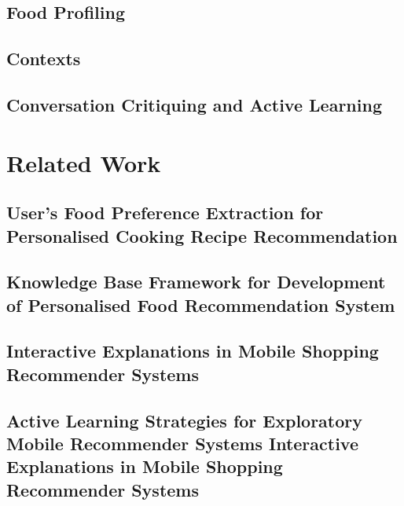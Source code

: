 \subsection{Food Profiling}

\subsection{Contexts}

\subsection{Conversation Critiquing and Active Learning}



\section{Related Work}

\subsection{User's Food Preference Extraction for Personalised Cooking Recipe Recommendation}

\subsection{Knowledge Base Framework for Development of Personalised Food Recommendation System}

\subsection{Interactive Explanations in Mobile Shopping Recommender Systems}

\subsection{Active Learning Strategies for Exploratory Mobile Recommender Systems Interactive Explanations in Mobile Shopping Recommender Systems}
